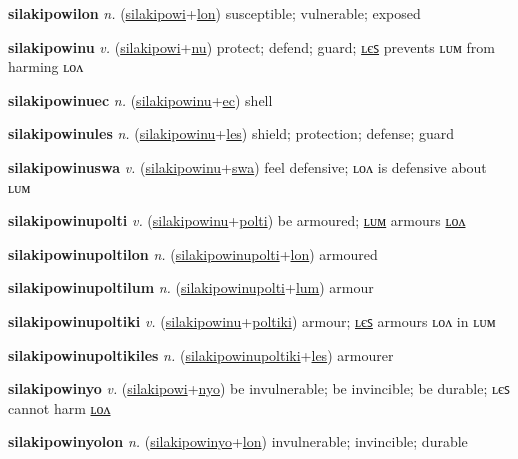 \textbf{\hypertarget{silakipowilon}{silakipowilon}} \textit{n.} (\hyperlink{silakipowi}{silakipowi}+\allowbreak \hyperlink{lon}{lon})
susceptible; vulnerable; exposed

\textbf{\hypertarget{silakipowinu}{silakipowinu}} \textit{v.} (\hyperlink{silakipowi}{silakipowi}+\allowbreak \hyperlink{nu}{nu})
protect; defend; guard; \hyperlink{silakipowinules}{ʟєꜱ} prevents ʟᴜᴍ from harming ʟᴏᴧ

\textbf{\hypertarget{silakipowinuec}{silakipowinuec}} \textit{n.} (\hyperlink{silakipowinu}{silakipowinu}+\allowbreak \hyperlink{ec}{ec})
shell

\textbf{\hypertarget{silakipowinules}{silakipowinules}} \textit{n.} (\hyperlink{silakipowinu}{silakipowinu}+\allowbreak \hyperlink{les}{les})
shield; protection; defense; guard

\textbf{\hypertarget{silakipowinuswa}{silakipowinuswa}} \textit{v.} (\hyperlink{silakipowinu}{silakipowinu}+\allowbreak \hyperlink{swa}{swa})
feel defensive; ʟᴏᴧ is defensive about ʟᴜᴍ

\textbf{\hypertarget{silakipowinupolti}{silakipowinupolti}} \textit{v.} (\hyperlink{silakipowinu}{silakipowinu}+\allowbreak \hyperlink{polti}{polti})
be armoured; \hyperlink{silakipowinupoltilum}{ʟᴜᴍ} armours \hyperlink{silakipowinupoltilon}{ʟᴏᴧ}

\textbf{\hypertarget{silakipowinupoltilon}{silakipowinupoltilon}} \textit{n.} (\hyperlink{silakipowinupolti}{silakipowinupolti}+\allowbreak \hyperlink{lon}{lon})
armoured

\textbf{\hypertarget{silakipowinupoltilum}{silakipowinupoltilum}} \textit{n.} (\hyperlink{silakipowinupolti}{silakipowinupolti}+\allowbreak \hyperlink{lum}{lum})
armour

\textbf{\hypertarget{silakipowinupoltiki}{silakipowinupoltiki}} \textit{v.} (\hyperlink{silakipowinu}{silakipowinu}+\allowbreak \hyperlink{poltiki}{poltiki})
armour; \hyperlink{silakipowinupoltikiles}{ʟєꜱ} armours ʟᴏᴧ in ʟᴜᴍ

\textbf{\hypertarget{silakipowinupoltikiles}{silakipowinupoltikiles}} \textit{n.} (\hyperlink{silakipowinupoltiki}{silakipowinupoltiki}+\allowbreak \hyperlink{les}{les})
armourer

\textbf{\hypertarget{silakipowinyo}{silakipowinyo}} \textit{v.} (\hyperlink{silakipowi}{silakipowi}+\allowbreak \hyperlink{nyo}{nyo})
be invulnerable; be invincible; be durable; ʟєꜱ cannot harm \hyperlink{silakipowinyolon}{ʟᴏᴧ}

\textbf{\hypertarget{silakipowinyolon}{silakipowinyolon}} \textit{n.} (\hyperlink{silakipowinyo}{silakipowinyo}+\allowbreak \hyperlink{lon}{lon})
invulnerable; invincible; durable

